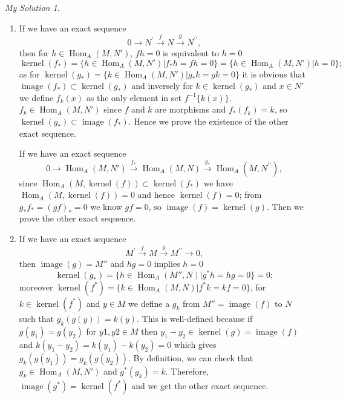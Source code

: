 \documentclass[]{article}
\theoremstyle{remark}
\newtheorem*{sol}{My Solution}
\begin{document}
\begin{sol}
	\begin{enumerate}
		\item If we have an exact sequence
		 \[ 0 \longrightarrow N^{\prime} \stackrel{f}{\longrightarrow} N \stackrel{g}{\longrightarrow} N^{\prime \prime} ,\]
		 then for $ h \in \operatorname{Hom}_{A}(M, N') $, $ fh=0 $ is equivalent to $ h=0 $ 
		 \[ \operatorname{kernel}(f_*) = \{ h \in \operatorname{Hom}_{A}(M, N') | f_*h=fh = 0 \} =\{ h \in \operatorname{Hom}_{A}(M, N') | h = 0 \} ;\]
		 as for $ \operatorname{kernel}(g_*) = \{ k \in \operatorname{Hom}_{A}(M, N') | g_*k=gk = 0 \} $ it is obvious that $ \operatorname{image}(f_*) \subset \operatorname{kernel}(g_*)$ and inversely for $ k \in \operatorname{kernel}(g_*) $ and $ x\in N' $ we define $  f_k(x)  $ as the only element in set $ f^{-1}\{k(x)\} $. $ f_k \in \operatorname{Hom}_{A}(M, N') $ since $ f $ and $ k $ are morphisms and $ f_*(f_k) = k $, so $   \operatorname{kernel}(g_*)\subset \operatorname{image}(f_*)$. Hence we prove the existence of the other exact sequence.
		 
		 If we have an exact sequence
		 \[ 0 \longrightarrow \operatorname{Hom}_{A}(M, N') \stackrel{f_*}{\longrightarrow} \operatorname{Hom}_{A}\left(M, N\right) \stackrel{g_*}{\longrightarrow} \operatorname{Hom}_{A}\left(M, N^{\prime \prime}\right) ,\]
		 since $ \operatorname{Hom}_{A}(M, \operatorname{kernel}(f)) \subset \operatorname{kernel}(f_*) $ we have $ \operatorname{Hom}_{A}(M, \operatorname{kernel}(f)) = 0 $ and hence $  \operatorname{kernel}(f) =0 $; from $ g_* f_* = (gf)_* =0 $ we know $ gf =0 $, so  $ \operatorname{image}(f)= \operatorname{kernel}(g)$. Then we prove the other exact sequence.
		 
		 \item If we have an exact sequence
		  \[ M^{\prime} \stackrel{f}{\longrightarrow} M \stackrel{g}{\longrightarrow} M^{\prime \prime} \longrightarrow 0 ,\]
		  then $ \operatorname{image}(g) = M'' $ and $ hg =0 $ implies $ h=0 $
		  \[ \operatorname{kernel}(g_*) = \{ h \in \operatorname{Hom}_{A}(M'', N) | g^*h=hg = 0 \} = 0; \]
		  moreover $ \operatorname{kernel}(f^*) = \{ k \in \operatorname{Hom}_{A}(M, N) | f^*k=kf = 0 \} $, for $ k \in \operatorname{kernel}(f^*) $ and $ y \in M $ we define a $ g_k $ from 
		  $ M'' = \operatorname{image}(f) $ to $ N $ such that $ g_k(g(y)) = k(y) $. This is well-defined because if $ g(y_1) = g(y_2)  $ for $ y1, y2 \in M $ then $ y_1 - y_2 \in \operatorname{kernel}(g) = \operatorname{image}(f) $ and $ k(y_1 - y_2) = k(y_1) -k(y_2) =0 $ which gives $ g_k(g(y_1)) = g_k(g(y_2))$. By definition, we can check that $ g_k \in \operatorname{Hom}_{A}(M, N') $ and $ g^*(g_k) = k $. Therefore, $ \operatorname{image}(g^*)= \operatorname{kernel}(f^*) $ and we get the other exact sequence.
		  

\end{enumerate}
\end{sol}
\end{document}
